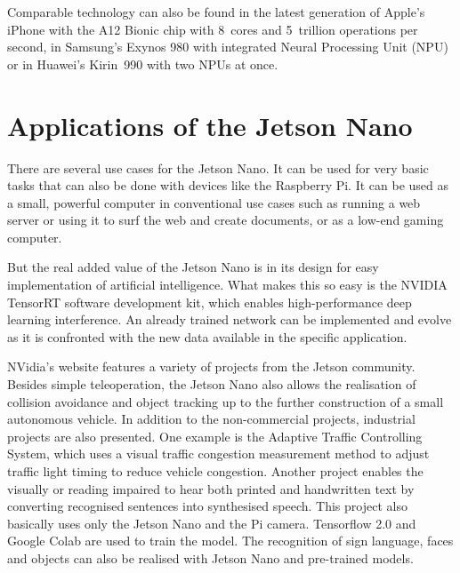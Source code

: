 \bigskip

Comparable technology can also be found in the latest generation of Apple's iPhone with the A12 Bionic chip with 8~cores and 5~trillion operations per second, in Samsung's Exynos 980 with integrated Neural Processing Unit (NPU) or in Huawei's Kirin~990 with two NPUs at once. \cite{SamsungExynos980:2020,HuaweiKirin990:2020}



\section{Applications of the Jetson Nano}

There are several use cases for the Jetson Nano. It can be used for very basic tasks that can also be done with devices like the Raspberry Pi. It can be used as a small, powerful computer in conventional use cases such as running a web server or using it to surf the web and create documents, or as a low-end gaming computer. \cite{Kurniawan:2021}

\bigskip

But the real added value of the Jetson Nano is in its design for easy implementation of artificial intelligence. What makes this so easy is the NVIDIA TensorRT software development kit, which enables high-performance deep learning interference. An already trained network can be implemented and evolve as it is confronted with the new data available in the specific application.

\bigskip

NVidia's \cite{JetsonProjects:2020} website features a variety of projects from the Jetson community. Besides simple teleoperation, the Jetson Nano also allows the realisation of collision avoidance and object tracking up to the further construction of a small autonomous vehicle. In addition to the non-commercial projects, industrial projects are also presented. One example is the Adaptive Traffic Controlling System, which uses a visual traffic congestion measurement method to adjust traffic light timing to reduce vehicle congestion. Another project enables the visually or reading impaired to hear both printed and handwritten text by converting recognised sentences into synthesised speech.  This project also basically uses only the Jetson Nano and the Pi camera.  Tensorflow 2.0 and Google Colab are used to train the model. The recognition of sign language, faces and objects can also be realised with Jetson Nano and pre-trained models.
